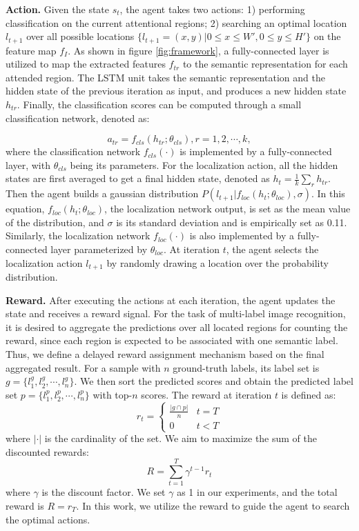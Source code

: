 \documentclass[letterpaper]{article} %
\begin{document}
\noindent\textbf{Action.} Given the state $s_t$, the agent takes two actions: 1) performing classification on the current attentional regions; 2) searching an optimal location $l_{t+1}$ over all possible locations $\{l_{t+1}=(x,y)|0\le{x}\le{W'},0\le{y}\le{H'}\}$ on the feature map $f_I$. As shown in figure \ref{fig:framework}, a fully-connected layer is utilized to map the extracted features $f_{tr}$ to the semantic representation for each attended region. The LSTM unit takes the semantic representation and the hidden state of the previous iteration as input, and produces a new hidden state $h_{tr}$. Finally, the classification scores can be computed through a small classification network, denoted as:

 \begin{equation}
      a_{tr}=f_{cls}(h_{tr};\theta_{cls}), r=1,2,\cdots,k,
\end{equation}
where the classification network $f_{cls}(\cdot)$ is implemented by a fully-connected layer, with $\theta_{cls}$ being its parameters. For the localization action, all the hidden states are first averaged to get a final hidden state, denoted as $h_t=\frac{1}{k}\sum_r{h_{tr}}$. Then the agent builds a gaussian distribution $P(l_{t+1}|f_{loc}(h_t;\theta_{loc}), \sigma)$. In this equation, $f_{loc}(h_t;\theta_{loc})$, the localization network output, is set as the mean value of the distribution, and $\sigma$ is its standard deviation and is empirically set as 0.11. Similarly, the localization network $f_{loc}(\cdot)$ is also implemented by a fully-connected layer parameterized by $\theta_{loc}$. At iteration $t$, the agent selects the localization action $l_{t+1}$ by randomly drawing a location over the probability distribution.

 
\noindent\textbf{Reward.}  After executing the actions at each iteration, the agent updates the state and receives a reward signal. For the task of multi-label image recognition, it is desired to aggregate the predictions over all located regions for counting the reward, since each region is expected to be associated with one semantic label. Thus, we define a delayed reward assignment mechanism based on the final aggregated result. For a sample with $n$ ground-truth labels, its label set is $g=\{l_1^g, l_2^g, \cdots, l_n^g\}$. We then sort the predicted scores and obtain the predicted label set $p=\{l_1^p, l_2^p, \cdots, l_n^p\}$ with top-$n$ scores. The reward at iteration $t$ is defined as:
\begin{equation}
    r_t=
   \begin{cases}
    \frac{|g\cap{p}|}{n} &\mbox{$t=T$}\\
    0 &\mbox{$t<T$}
   \end{cases}
\end{equation}
where $|\cdot|$ is the cardinality of the set. We aim to maximize the sum of the discounted rewards:
 \begin{equation}
      R=\sum_{t=1}^T{\gamma^{t-1}r_t}
\end{equation}
where $\gamma$ is the discount factor. We set $\gamma$ as 1 in our experiments, and the total reward is $R=r_T$. In this work, we utilize the reward to guide the agent to search the optimal actions.
\end{document}
